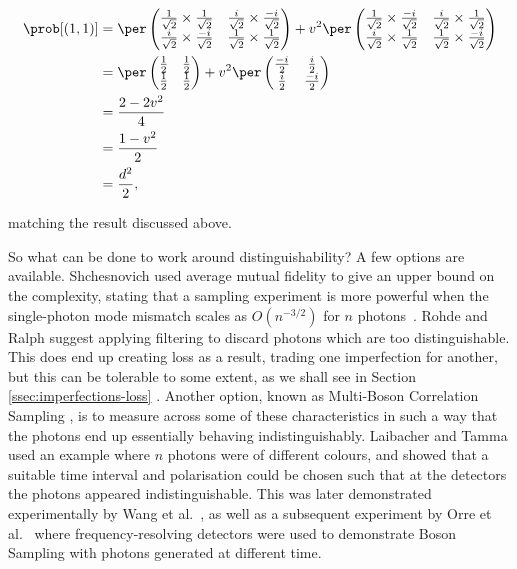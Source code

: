 \begin{align}
\prob[(1,1)] &= \per\begin{pmatrix}\frac{1}{\sqrt{2}}\times\frac{1}{\sqrt{2}}&\frac{i}{\sqrt{2}}\times\frac{-i}{\sqrt{2}}\\\frac{i}{\sqrt{2}}\times\frac{-i}{\sqrt{2}}&\frac{1}{\sqrt{2}}\times\frac{1}{\sqrt{2}}\end{pmatrix} + v^2 \per\begin{pmatrix}\frac{1}{\sqrt{2}}\times\frac{-i}{\sqrt{2}}&\frac{i}{\sqrt{2}}\times\frac{1}{\sqrt{2}}\\\frac{i}{\sqrt{2}}\times\frac{1}{\sqrt{2}}&\frac{1}{\sqrt{2}}\times\frac{-i}{\sqrt{2}}\end{pmatrix}\\
&= \per\begin{pmatrix}\frac{1}{2}&\frac{1}{2}\\\frac{1}{2}&\frac{1}{2}\end{pmatrix} + v^2 \per\begin{pmatrix}\frac{-i}{2}&\frac{i}{2}\\\frac{i}{2}&\frac{-i}{2}\end{pmatrix}\\
&= \frac{2-2v^2}{4}\\
&= \frac{1-v^2}{2}\\
&= \frac{d^2}{2},
\end{align}

\noindent matching the result discussed above.

So what can be done to work around distinguishability? A few options are available. Shchesnovich used average mutual fidelity to give an upper bound on the complexity, stating that a sampling experiment is more powerful when the single-photon mode mismatch scales as $O(n^{-3/2})$ for $n$ photons~\cite{shchesnovich2014}. Rohde and Ralph \cite{rohde2012} suggest applying filtering to discard photons which are too distinguishable. This does end up creating loss as a result, trading one imperfection for another, but this can be tolerable to some extent, as we shall see in Section \ref{ssec:imperfections-loss} \cite{rohde2012, aaronson2016}. Another option, known as Multi-Boson Correlation Sampling \cite{tamma2014, tamma2015, laibacher2015, tamma2016, laibacher2017}, is to measure across some of these characteristics in such a way that the photons end up essentially behaving indistinguishably. Laibacher and Tamma used an example where $n$ photons were of different colours, and showed that a suitable time interval and polarisation could be chosen such that at the detectors the photons appeared indistinguishable. This was later demonstrated experimentally by Wang et al.~\cite{wang2018timebin}, as well as a subsequent experiment by Orre et al.~\cite{orre2019} where frequency-resolving detectors were used to demonstrate Boson Sampling with photons generated at different time.

